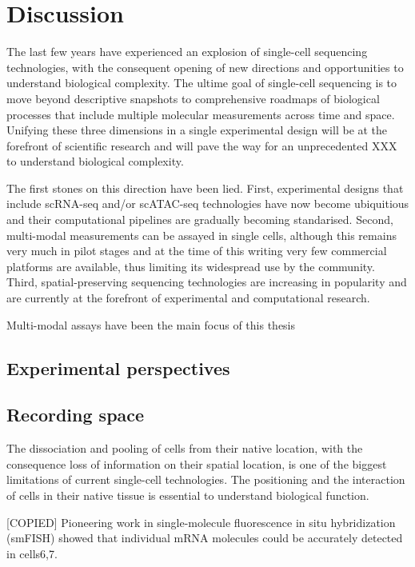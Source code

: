 \section{Discussion}

The last few years have experienced an explosion of single-cell sequencing technologies, with the consequent opening of new directions and opportunities to understand biological complexity. The ultime goal of single-cell sequencing is to move beyond descriptive snapshots to comprehensive roadmaps of biological processes that include multiple molecular measurements across time and space. Unifying these three dimensions in a single experimental design will be at the forefront of scientific research and will pave the way for an unprecedented XXX to understand biological complexity.
 
The first stones on this direction have been lied. First, experimental designs that include scRNA-seq and/or scATAC-seq technologies have now become ubiquitious and their computational pipelines are gradually becoming standarised. Second, multi-modal measurements can be assayed in single cells, although this remains very much in pilot stages and at the time of this writing very few commercial platforms are available, thus limiting its widespread use by the community. Third, spatial-preserving sequencing technologies are increasing in popularity and are currently at the forefront of experimental and computational research.

Multi-modal assays have been the main focus of this thesis

\subsection{Experimental perspectives} 

\subsection{Recording space} 

The dissociation and pooling of cells from their native location, with the consequence loss of information on their spatial location, is one of the biggest limitations of current single-cell technologies. The positioning and the interaction of cells in their native tissue is essential to understand biological function. 

[COPIED] Pioneering work in single-molecule fluorescence in situ hybridization (smFISH) showed that individual mRNA molecules could be accurately detected in cells6,7. 

